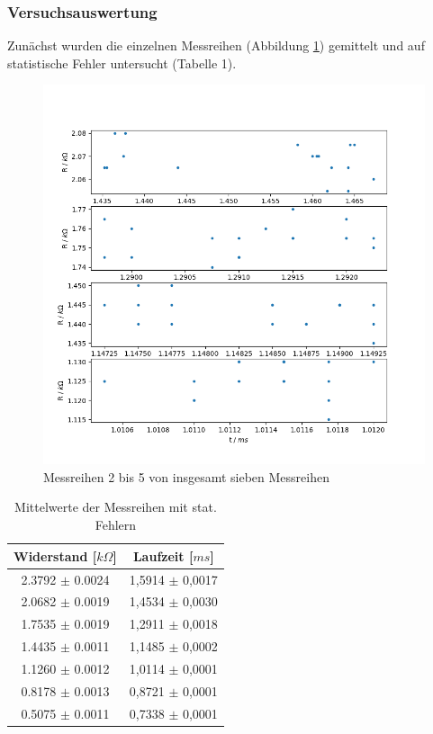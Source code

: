 \documentclass[12pt,a4paper]{article}
\author{Moritz}
\begin{document}
	


	\subsubsection{Versuchsauswertung}
	
	Zunächst wurden die einzelnen Messreihen (Abbildung \ref{pic:messreihen_laufzeit}) gemittelt und auf statistische Fehler untersucht (Tabelle 1).
	\begin{figure}
	\begin{center}
		\includegraphics[width=0.5\linewidth]{messreihen_2bis5_laufzeit}
		\caption{Messreihen 2 bis 5 von insgesamt sieben Messreihen}
		\label{pic:messreihen_laufzeit}
	\end{center}
	\end{figure}
	\begin{table}
		\begin{center}
			\begin{tabular}{|c|c|}
				\hline
				\textbf{Widerstand [$k\Omega$]} & \textbf{Laufzeit [$ms$]} \\
				\hline
				2.3792 $\pm$ 0.0024 & 1,5914 $\pm$ 0,0017\\
				\hline
				2.0682 $\pm$ 0.0019 & 1,4534 $\pm$ 0,0030\\
				\hline
				1.7535 $\pm$ 0.0019 & 1,2911 $\pm$ 0,0018\\
				\hline
				1.4435 $\pm$ 0.0011& 1,1485 $\pm$ 0,0002\\
				\hline
				1.1260 $\pm$ 0.0012& 1,0114 $\pm$ 0,0001\\
				\hline
				0.8178 $\pm$ 0.0013& 0,8721 $\pm$ 0,0001 \\
				\hline
				0.5075 $\pm$ 0.0011&  0,7338 $\pm$ 0,0001 \\
				\hline
			\end{tabular}
		\end{center}
		\caption{Mittelwerte der Messreihen mit stat. Fehlern}
	\end{table}	
\end{document}

